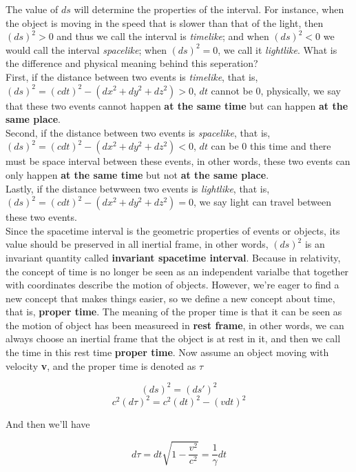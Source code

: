 \documentclass[12pt]{article}
\begin{document}
The value of $ds$ will determine the properties of the interval. For instance, when the object is moving in the speed that is slower than that of the light, then $(ds)^2 > 0$ and thus we call the interval is \textit{timelike}; and when $(ds)^2 < 0$ we would call the interval \textit{spacelike}; when $(ds)^2 = 0$, we call it \textit{lightlike}. What is the difference and physical meaning behind this seperation?
\\
\indent
First, if the distance between two events is \textit{timelike}, that is, $(ds)^2 = (cdt)^2 - (dx^2 + dy^2 + dz^2) > 0$, $dt$ cannot be $0$, physically, we say that these two events cannot happen \textbf{at the same time} but can happen \textbf{at the same place}.
\\
\indent
Second, if the distance between two events is \textit{spacelike}, that is, $(ds)^2 = (cdt)^2 - (dx^2 + dy^2 + dz^2) < 0$, $dt$ can be $0$ this time and there must be space interval between these events, in other words, these two events can only happen \textbf{at the same time} but not \textbf{at the same place}.
\\
\indent
Lastly, if the distance betwween two events is \textit{lightlike}, that is, $(ds)^2 = (cdt)^2 - (dx^2 + dy^2 + dz^2) = 0$, we say light can travel between these two events.
\\
\indent
Since the spacetime interval is the geometric properties of events or objects, its value should be preserved in all inertial frame, in other words, $(ds)^2$ is an invariant quantity called \textbf{invariant spacetime interval}. Because in relativity, the concept of time is no longer be seen as an independent varialbe that together with coordinates describe the motion of objects. However, we're eager to find a new concept that makes things easier, so we define a new concept about time, that is, \textbf{proper time}. The meaning of the proper time is that it can be seen as the motion of object has been measureed in \textbf{rest frame}, in other words, we can always choose an inertial frame that the object is at rest in it, and then we call the time in this rest time \textbf{proper time}.
Now assume an object moving with velocity \textbf{v}, and the proper time is denoted as $\tau$
\begin{center}
    \[ (ds)^2 = (ds')^2 \]
    \[ c^2(d\tau)^2 = c^2(dt)^2 - (vdt)^2 \]
\end{center}

And then we'll have 

\begin{center}
    \[d\tau = dt \sqrt{1 - \frac{v^2}{c^2}} = \frac{1}{\gamma} dt \]
\end{center}
\end{document}
